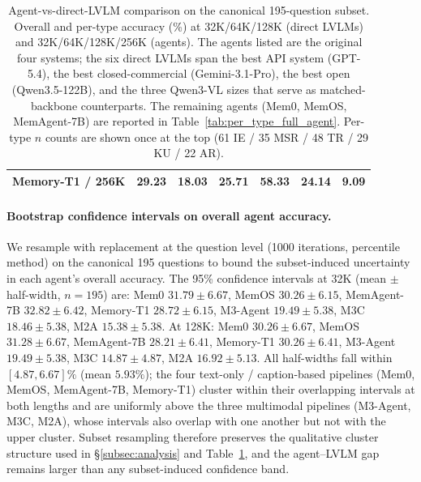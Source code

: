 \documentclass{llmxive}
\begin{document}
\begin{table}[!htbp]
\begin{tabular}{@{}lcccccc@{}}
Memory-T1 / 256K          & 29.23 & 18.03 & 25.71 & 58.33 & 24.14 &  9.09 \\
\bottomrule
\end{tabular}
\caption{Agent-vs-direct-LVLM comparison on the canonical 195-question subset. Overall and per-type accuracy (\%) at 32K/64K/128K (direct LVLMs) and 32K/64K/128K/256K (agents). The agents listed are the original four systems; the six direct LVLMs span the best API system (GPT-5.4), the best closed-commercial (Gemini-3.1-Pro), the best open (Qwen3.5-122B), and the three Qwen3-VL sizes that serve as matched-backbone counterparts. The remaining agents (Mem0, MemOS, MemAgent-7B) are reported in Table~\ref{tab:per_type_full_agent}. Per-type $n$ counts are shown once at the top (61 IE / 35 MSR / 48 TR / 29 KU / 22 AR).}
\label{tab:agent_vs_vlm_195}
\end{table}

\paragraph{Bootstrap confidence intervals on overall agent accuracy.}
We resample with replacement at the question level (1000 iterations, percentile method) on the canonical 195 questions to bound the subset-induced uncertainty in each agent's overall accuracy. The 95\% confidence intervals at 32K (mean $\pm$ half-width, $n=195$) are: Mem0 $31.79 \pm 6.67$, MemOS $30.26 \pm 6.15$, MemAgent-7B $32.82 \pm 6.42$, Memory-T1 $28.72 \pm 6.15$, M3-Agent $19.49 \pm 5.38$, M3C $18.46 \pm 5.38$, M2A $15.38 \pm 5.38$. At 128K: Mem0 $30.26 \pm 6.67$, MemOS $31.28 \pm 6.67$, MemAgent-7B $28.21 \pm 6.41$, Memory-T1 $30.26 \pm 6.41$, M3-Agent $19.49 \pm 5.38$, M3C $14.87 \pm 4.87$, M2A $16.92 \pm 5.13$. All half-widths fall within $[4.87, 6.67]\%$ (mean $5.93\%$); the four text-only / caption-based pipelines (Mem0, MemOS, MemAgent-7B, Memory-T1) cluster within their overlapping intervals at both lengths and are uniformly above the three multimodal pipelines (M3-Agent, M3C, M2A), whose intervals also overlap with one another but not with the upper cluster. Subset resampling therefore preserves the qualitative cluster structure used in \S\ref{subsec:analysis} and Table~\ref{tab:agent_vs_vlm_195}, and the agent--LVLM gap remains larger than any subset-induced confidence band.
\end{document}
